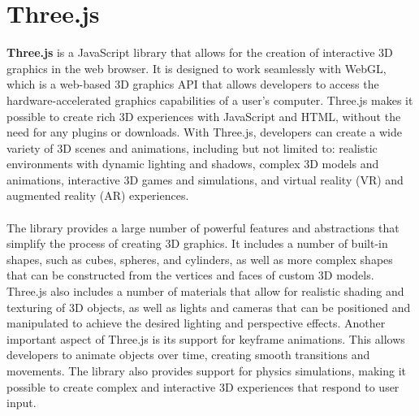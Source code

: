 \section{Three.js}
\textbf{Three.js} is a JavaScript library that allows for the creation of interactive 3D graphics in the web 
browser. It is designed to work seamlessly with WebGL, which is a web-based 3D graphics API that allows 
developers to access the hardware-accelerated graphics capabilities of a user's computer. Three.js 
makes it possible to create rich 3D experiences with JavaScript and HTML, without the need for any plugins or downloads.
With Three.js, developers can create a wide variety of 3D scenes and animations, including but not limited to: 
realistic environments with dynamic lighting and shadows, complex 3D models and animations, interactive 3D 
games and simulations, and virtual reality (VR) and augmented reality (AR) experiences.
\\
\\
The library provides a large number of powerful features and abstractions that simplify 
the process of creating 3D graphics. It includes a number of built-in shapes, such as cubes, 
spheres, and cylinders, as well as more complex shapes that can be constructed from the 
vertices and faces of custom 3D models. Three.js also includes a number of materials that 
allow for realistic shading and texturing of 3D objects, as well as lights and cameras 
that can be positioned and manipulated to achieve the desired lighting and perspective effects.
Another important aspect of Three.js is its support for keyframe animations. This allows
developers to animate objects over time, creating smooth transitions and movements. 
The library also provides support for physics simulations, making it possible to 
create complex and interactive 3D experiences that respond to user input.
\\
\\
